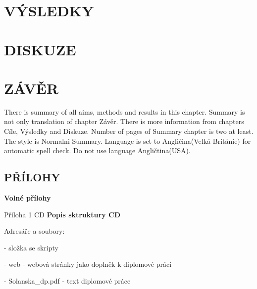 \documentclass{thesisKGI}
\begin{document}
    \newpage
    \section{VÝSLEDKY}

    \newpage
    \section{DISKUZE}

    \newpage
    \section{ZÁVĚR}



    \begin{summary}
      There is summary of all aims, methods and results in this chapter.
      Summary is not only translation of chapter Závěr. There is more
      information from chapters Cíle, Výsledky and Diskuze. Number of
      pages of Summary chapter is two at least. The style is Normalni
      Summary. Language is set to Angličina(Velká Británie) for automatic
      spell check. Do not use language Angličtina(USA). 
    \end{summary}

    \newpage
    \vspace*{180pt}
    \begin{center}
    \section*{PŘÍLOHY}
    \end{center}
    \vspace*{\fill}

    \newpage
    \begin{prilohy}
      \textbf{Volné přílohy}

      Příloha 1 CD \newline
      \newline
      \textbf{Popis sktruktury CD}

        Adresáře a soubory:

          - složka se skripty

          - web - webová stránky jako doplněk k diplomové práci

          - Solanska\_dp.pdf - text diplomové práce

      \vspace*{\fill}
  \end{prilohy}
      
  
\end{document}
